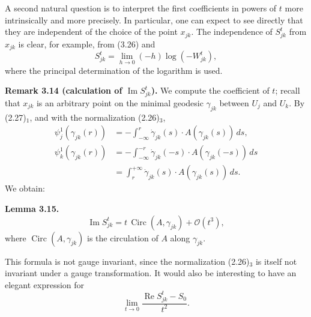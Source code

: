 \documentclass[11pt]{article}
\newcommand{\Ree}{\operatorname{Re}}
\newcommand{\Imm}{\operatorname{Im}}
\newcommand{\Circ}{\operatorname{Circ}}
\newcommand{\OO}{\mathcal O}
\newcommand{\dd}{\,d}
\begin{document}
A second natural question is to interpret the first coefficients in powers of $t$ more intrinsically and more precisely. In particular, one can expect to see directly that they are independent of the choice of the point $x_{jk}$. The independence of $S_{jk}^t$ from $x_{jk}$ is clear, for example, from (3.26) and
\[
S_{jk}^t=\lim_{h\to0}(-h)\log(-W_{jk}^t),
\]
where the principal determination of the logarithm is used.

\medskip
\noindent\textbf{Remark 3.14 (calculation of $\Imm S_{jk}^t$).}
We compute the coefficient of $t$; recall that $x_{jk}$ is an arbitrary point on the minimal geodesic $\gamma_{jk}$ between $U_j$ and $U_k$. By (2.27)$_1$, and with the normalization (2.26)$_3$,
\begin{align*}
\psi_j^1(\gamma_{jk}(r))
&=-\int_{-\infty}^{r}
\dot\gamma_{jk}(s)\cdot A(\gamma_{jk}(s))\dd s,\\
\psi_k^1(\gamma_{jk}(r))
&=-\int_{-\infty}^{-r}
\dot\gamma_{jk}(-s)\cdot A(\gamma_{jk}(-s))\dd s\\
&=\int_{r}^{+\infty}
\dot\gamma_{jk}(s)\cdot A(\gamma_{jk}(s))\dd s.
\end{align*}
We obtain:

\medskip
\noindent\textbf{Lemma 3.15.}
\begin{equation}
\Imm S_{jk}^t
=t\,\Circ(A,\gamma_{jk})+\OO(t^3),
\tag{3.34}
\end{equation}
where $\Circ(A,\gamma_{jk})$ is the circulation of $A$ along $\gamma_{jk}$.

This formula is not gauge invariant, since the normalization (2.26)$_3$ is itself not invariant under a gauge transformation. It would also be interesting to have an elegant expression for
\[
\lim_{t\to0}\frac{\Ree S_{jk}^t-S_0}{t^2}.
\]
\end{document}
